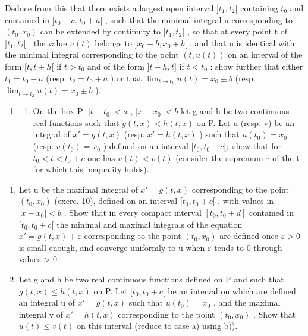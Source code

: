Deduce from this that there exists a largest open interval \(]t_{1}, t_{2}[\) containing \(t_{0}\) and contained in \(]t_{0}-a, t_{0}+a[\) , such that the minimal integral u corresponding to \((t_{0}, x_{0})\) can be extended by continuity to \(]t_{1}, t_{2}[\) , so that at every point t of \(]t_{1}, t_{2}[\) , the value \(u(t)\) belongs to \(]x_{0}-b, x_{0}+b[\) , and that u is identical with the minimal integral corresponding to the point \((t, u(t))\) on an interval of the form \([t, t+h[\) if \(t > t_{0}\) and of the form \(]t-h, t]\) if \(t < t_{0}\) ; show further that either \(t_{1} = t_{0} - a\) (resp. \(t_{2} = t_{0} + a\) ) or that \(\lim_{t \to t_{1}} u(t) = x_{0} \pm b\) (resp. \(\lim_{t \to t_{2}} u(t) = x_{0} \pm b\) ).

\begin{enumerate}
\def\labelenumi{\arabic{enumi})}
\setcounter{enumi}{10}
\tightlist
\item
  \begin{enumerate}
  \def\labelenumii{\alph{enumii})}
  \tightlist
  \item
    On the box P: \(|t - t_{0}| < a\) , \(|x - x_{0}| < b\) let g and h be two continuous real functions such that \(g(t, x) < h(t, x)\) on P. Let u (resp. v) be an integral of \(x' = g(t, x)\) (resp. \(x' = h(t, x)\) ) such that \(u(t_{0}) = x_{0}\) (resp. \(v(t_{0}) = x_{0}\) ) defined on an interval \([t_{0}, t_{0} + c[;\) show that for \(t_{0} < t < t_{0} + c\) one has \(u(t) < v(t)\) (consider the supremum \(\tau\) of the t for which this inequality holds).
  \end{enumerate}
\end{enumerate}

\begin{enumerate}
\def\labelenumi{\alph{enumi})}
\setcounter{enumi}{1}
\item
  Let u be the maximal integral of \(x' = g(t, x)\) corresponding to the point \((t_0, x_0)\) (exerc. 10), defined on an interval \([t_0, t_0 + c[\) , with values in \(|x - x_0| < b\) . Show that in every compact interval \([t_0, t_0 + d]\) contained in \([t_0, t_0 + c[\) the minimal and maximal integrals of the equation \(x' = g(t, x) + \varepsilon\) corresponding to the point \((t_0, x_0)\) are defined once \(\varepsilon > 0\) is small enough, and converge uniformly to u when \(\varepsilon\) tends to 0 through values \textgreater{} 0.
\item
  Let g and h be two real continuous functions defined on P and such that \(g(t, x) \leqslant h(t, x)\) on P. Let \([t_0, t_0 + c[\) be an interval on which are defined an integral u of \(x' = g(t, x)\) such that \(u(t_0) = x_0\) , and the maximal integral v of \(x' = h(t, x)\) corresponding to the point \((t_0, x_0)\) . Show that \(u(t) \leqslant v(t)\) on this interval (reduce to case a) using b)).
\end{enumerate}

